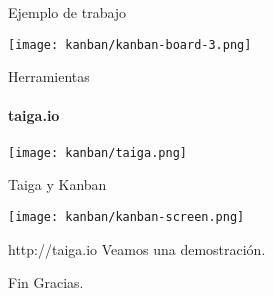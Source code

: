 \documentclass[xcolor=dvipsnames]{beamer}
\begin{document}
\begin{frame}{Ejemplo de trabajo}
  \begin{center}
      \texttt{[image: kanban/kanban-board-3.png]}
  \end{center}
\end{frame}

\begin{frame}{Herramientas}
  \framesubtitle{taiga.io}
  \begin{center}
      \texttt{[image: kanban/taiga.png]}
  \end{center}
\end{frame}

\begin{frame}{Taiga y Kanban}
  \begin{center}
      \texttt{[image: kanban/kanban-screen.png]}
  \end{center}
\end{frame}

\begin{frame}{http://taiga.io}
  Veamos una demostraci\'on.
\end{frame}

\begin{frame}{Fin}
  Gracias.
\end{frame}
\end{document}
